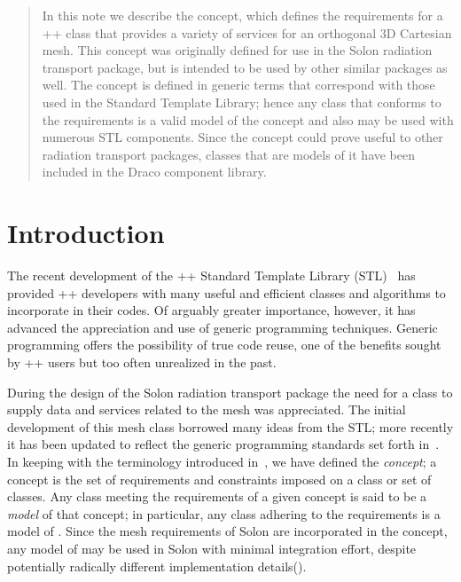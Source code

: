 \documentclass[11pt]{rnote}
\begin{document}
\begin{abstract}

In this note we describe the  concept, which defines the
requirements for a \C++ class that provides a variety of services for
an orthogonal 3D Cartesian mesh. This concept was originally defined
for use in the Solon radiation transport package, but is intended to
be used by other similar packages as well. The  concept is 
defined in generic terms that correspond with those used in the
Standard Template Library; hence any class that conforms to the
 requirements is a valid model of the  concept
and also may be used with numerous STL components. Since the
 concept could prove useful to other radiation transport
packages, classes that are models of it have been included in the
Draco component library.

\end{abstract}

\section{Introduction}

The recent development of the \C++ Standard Template Library
(STL)~\cite{ansi:cpp} has
provided \C++ developers with many useful and efficient classes and
algorithms to incorporate in their codes. Of arguably greater
importance, however, it has advanced the appreciation and use of
generic programming techniques. Generic programming offers the
possibility of true code reuse, one of the benefits sought by \C++
users but too often unrealized in the past.

During the design of the Solon radiation transport package the need
for a class to supply data and services related to the mesh was
appreciated. The initial development of this mesh class borrowed many
ideas from the STL; more recently it has been updated to reflect the
generic programming standards set forth in~\cite{au99}. In keeping with the
terminology introduced in~\cite{au99}, we have defined the  {\it
  concept}; a concept is the set of requirements and constraints
imposed on a class or set of classes. Any class meeting the
requirements of a given concept is said to be a {\it model} of that
concept; in particular, any class adhering to the 
requirements is a model of . Since the mesh requirements
of Solon are incorporated in the  concept, any model of
 may be used in Solon with minimal integration effort,
despite potentially radically different implementation details().
\end{document}
